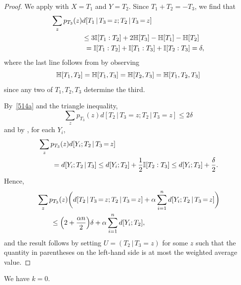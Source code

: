 \begin{proof}\leanok
  We apply  with $X=T_1$ and $Y=T_2$.
  Since $T_1+T_2=-T_3$, we find that
  \begin{equation}\label{514a}
  \begin{split}
    \sum_{z} p_{T_3}(z) & d[T_1 \,|\, T_3 \mathop{=} z;T_2 \,|\, T_3 \mathop{=} z] \\
    &\leq  3 \mathbb{I}[T_1 : T_2] + 2 \mathbb{H}[T_3] - \mathbb{H}[T_1] - \mathbb{H}[T_2] \\
    &\ = \mathbb{I}[T_1 : T_2] + \mathbb{I}[T_1 : T_3] + \mathbb{I}[T_2 : T_3]
    = \delta,
  \end{split}
\end{equation}
  where the last line follows from  by observing
  \[
    \mathbb{H}[T_1,T_2] = \mathbb{H}[T_1,T_3] = \mathbb{H}[T_2,T_3] = \mathbb{H}[T_1,T_2,T_3]
  \]
  since any two of $T_1,T_2,T_3$ determine the third.

  By~\eqref{514a} and the triangle inequality,
  \[
    \sum_z p_{T_3}(z) d[T_2 \,|\, T_3 \mathop{=} z; T_2 \,|\, T_3\mathop{=}z] \leq 2 \delta
  \]
  and by , for each $Y_i$,
  \begin{align*}
    &\sum_z p_{T_3}(z) d[Y_i; T_2 \,|\, T_3 \mathop{=} z] \\
    &\qquad= d[Y_i; T_2 \,|\, T_3]
                                    \leq d[Y_i;T_2] + \frac12 \mathbb{I}[T_2 : T_3]
                                    \leq d[Y_i;T_2] + \frac{\delta}{2}.
  \end{align*}
  Hence,
  \begin{align*}
    &\sum_z p_{T_3}(z) \bigg( d[T_2 \,|\, T_3 \mathop{=} z; T_2 \,|\, T_3 \mathop{=} z] + \alpha \sum_{i=1}^n d[Y_i;T_2 \,|\, T_3 \mathop{=} z] \bigg) \\
    &\qquad \leq
    \Bigl(2 + \frac{\alpha n}{2} \Bigr) \delta + \alpha \sum_{i=1}^n d[Y_i; T_2],
  \end{align*}
  and the result follows by setting $U=(T_2 \,|\, T_3 \mathop{=} z)$ for some $z$ such that the quantity in parentheses on the left-hand side is at most the weighted average value.
\end{proof}

\begin{proposition}\label{k-vanish}\leanok  We have $k = 0$.
\end{proposition}

